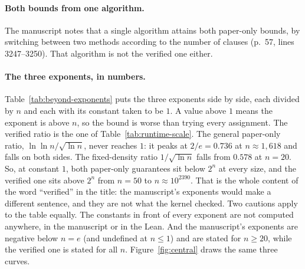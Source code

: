 \paragraph{Both bounds from one algorithm.}
The manuscript notes that a single algorithm attains both paper-only
bounds, by switching between two methods according to the number of
clauses (p.~57, lines 3247--3250). That algorithm is not the verified one
either.

\paragraph{The three exponents, in numbers.}
Table~\ref{tab:beyond-exponents} puts the three exponents side by side,
each divided by $n$ and each with its constant taken to be $1$. A value
above $1$ means the exponent is above $n$, so the bound is worse than
trying every assignment. The verified ratio is the one of
Table~\ref{tab:runtime-scale}. The general paper-only ratio,
$\ln\ln n/\sqrt{\ln n}$, never reaches $1$: it peaks at $2/e = 0.736$
at $n \approx 1{,}618$ and falls on both sides. The fixed-density ratio
$1/\sqrt{\ln n}$ falls from $0.578$ at $n = 20$. So, at constant $1$,
both paper-only guarantees sit below $2^n$ at every size, and the
verified one sits above $2^n$ from $n = 50$ to $n \approx 10^{2390}$.
That is the whole content of the word ``verified'' in the title: the
manuscript's exponents would make a different sentence, and they are
not what the kernel checked. Two cautions apply to the table equally.
The constants in front of every exponent are not computed anywhere, in
the manuscript or in the Lean. And the manuscript's exponents are
negative below $n = e$ (and undefined at $n \le 1$) and are stated for $n \ge 20$, while the
verified one is stated for all $n$. Figure~\ref{fig:central} draws the
same three curves.

\begin{table}[htbp]
\centering
\caption{The three exponents of the manuscript, each divided by $n$,
with every constant taken to be $1$. A value above $1$ means the bound
is worse than trying every assignment at that $n$. Columns: the verified
$\rhon/n = (\ln\ln(n+16))^2/\sqrt{\ln(n+16)}$ (comparator lines
132--134); Theorem~1.1's general exponent $\ln\ln n/\sqrt{\ln n}$ (p.~2,
line 59); its fixed-density exponent $1/\sqrt{\ln n}$ (p.~2, line 62).
Natural logarithms throughout (p.~1, lines 48--49). The row $e^{e^2}$ is
where the general ratio peaks ($2/e$). Regenerate:
\texttt{python3 -I paper3/scripts/beyond\_claims.py}.}
\label{tab:beyond-exponents}
\small

\end{table}

